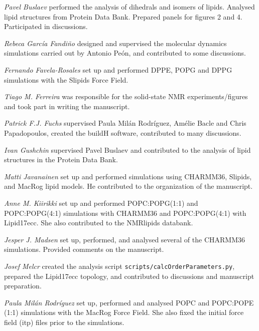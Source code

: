 \documentclass[journal=jpcbfk]{achemso}
\begin{document}
\noindent
{\it Pavel Buslaev}
performed the analysis of dihedrals and isomers of lipids. Analysed lipid structures from Protein Data Bank. Prepared panels for figures 2 and 4. Participated in discussions.

\noindent
{\it Rebeca Garc{\'i}a Fandi{\~n}o}
designed and supervised the molecular dynamics simulations carried out by Antonio Pe{\'o}n, and contributed to some discussions.

\noindent
{\it Fernando Favela-Rosales} 
set up and performed DPPE, POPG and DPPG simulations with the Slipids Force Field.

\noindent
{\it Tiago M. Ferreira}
was responsible for the solid-state NMR experiments/figures and took part in writing the manuscript.

\noindent
{\it Patrick F.J. Fuchs} supervised Paula Mil{\'a}n Rodr{\'i}guez, Am{\'e}lie Bacle and Chris Papadopoulos, created the buildH software, contributed to many discussions.

\noindent
{\it Ivan Gushchin} supervised Pavel Buslaev and contributed to the analysis of lipid structures in the Protein Data Bank.

\noindent
{\it Matti Javanainen} set up and performed simulations using CHARMM36, Slipids, and MacRog lipid models. He contributed to the organization of the manuscript.

\noindent
{\it Anne M. Kiirikki} set up and performed POPC:POPG(1:1) and POPC:POPG(4:1) simulations with CHARMM36 and POPC:POPG(4:1) with Lipid17ecc. She also contributed to the NMRlipids databank.

\noindent
{\it Jesper J. Madsen}
set up, performed, and analysed several of the CHARMM36 simulations.
Provided comments on the manuscript.

\noindent
{\it Josef Melcr}
created the analysis script \texttt{scripts/calcOrderParameters.py}, 
prepared the Lipid17ecc topology, 
and contributed to discussions and manuscript preparation.

\noindent
{\it Paula Mil{\'a}n Rodr{\'i}guez} set up, performed and analysed POPC and POPC:POPE (1:1) simulations with the MacRog Force Field. She also fixed the initial force field (itp) files prior to the simulations.
\end{document}

